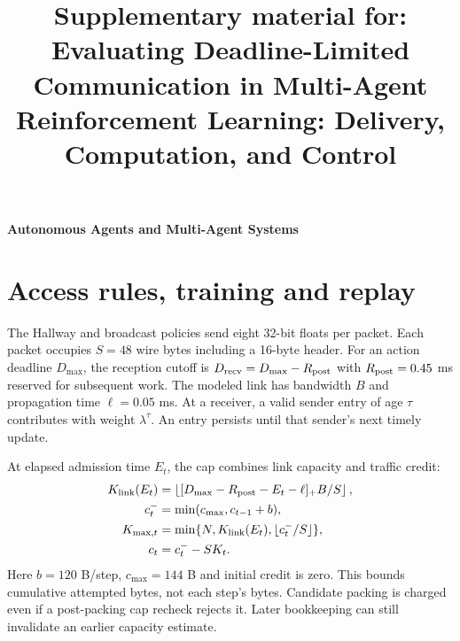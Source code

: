 \documentclass[pdflatex,sn-mathphys-num]{sn-jnl}
\begin{document}
\title{Supplementary material for: Evaluating Deadline-Limited Communication in Multi-Agent Reinforcement Learning: Delivery, Computation, and Control}
\author[1]{ }
\author*[1]{ }

\maketitle
{\RaggedRight\textbf{Autonomous Agents and Multi-Agent Systems}\par}
\renewcommand{\thesection}{S\arabic{section}}
\renewcommand{\thetable}{S\arabic{table}}
\renewcommand{\thefigure}{S\arabic{figure}}
\section{Access rules, training and replay}\label{app:settings}
The Hallway and broadcast policies send eight 32-bit floats per packet. Each packet occupies $S=48$ wire bytes including a 16-byte header. For an action deadline $D_{\max}$, the reception cutoff is $D_{\rm recv}=D_{\max}-R_{\rm post}$ with $R_{\rm post}=0.45$ ms reserved for subsequent work. The modeled link has bandwidth $B$ and propagation time $\ell=0.05$ ms. At a receiver, a valid sender entry of age $\tau$ contributes with weight $\lambda^\tau$. An entry persists until that sender's next timely update.

At elapsed admission time $E_t$, the cap combines link capacity and traffic credit:
\begin{align}
 K_{\rm link}(E_t)&=\left\lfloor [D_{\max}-R_{\rm post}-E_t-\ell]_+B/S\right\rfloor,\label{eq:cap}\\
 c_t^-&=\min(c_{\max},c_{t-1}+b),\nonumber\\ K_{\max,t}&=\min\{N,K_{\rm link}(E_t),\lfloor c_t^-/S\rfloor\},\\
 c_t&=c_t^- - SK_t.
\end{align}
Here $b=120$ B/step, $c_{\max}=144$ B and initial credit is zero. This bounds cumulative attempted bytes, not each step's bytes. Candidate packing is charged even if a post-packing cap recheck rejects it. Later bookkeeping can still invalidate an earlier capacity estimate.
\end{document}
